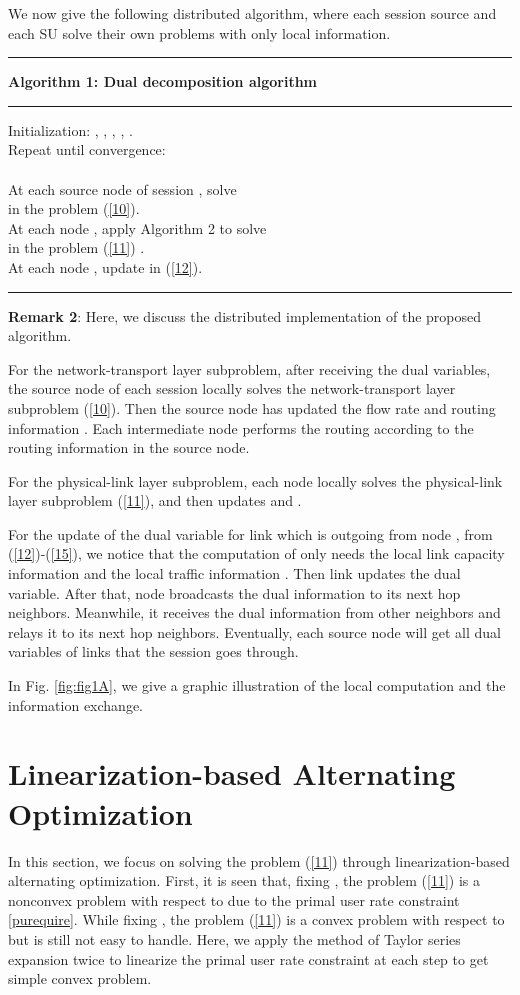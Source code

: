 \documentclass[12pt,onecolumn,tworows]{IEEEtran}
\begin{document}
We now give the following distributed algorithm, where
each session source and each SU solve their own problems with only
local information.

\noindent\rule{520pt}{1pt}
 \textbf{Algorithm 1: Dual decomposition algorithm}\\
 \noindent\rule{520pt}{0.65pt}
Initialization: , , , , .\\
Repeat until convergence:\\
 \indent  \indent \\
 \indent  \indent At each source node of session , solve  \\
  \indent  \indent in the problem (\ref{10}).\\
 \indent  \indent At each node , apply Algorithm 2 to solve\\
 \indent  \indent 
 in the problem (\ref{11}) .\\
 \indent  \indent At each node , update  in (\ref{12}).\\
\noindent\rule{520pt}{1pt}

\textbf{Remark 2}: Here, we discuss the distributed implementation of the proposed algorithm.

For the network-transport layer subproblem, after receiving the dual variables, the source node  of each session  locally solves the network-transport layer subproblem (\ref{10}).
Then the source node has updated the flow rate  and routing information . Each intermediate node performs the routing according to the routing information  in the source node.

For the physical-link layer subproblem, each node  locally solves the physical-link layer subproblem (\ref{11}), and then updates  and .

For the update of the dual variable  for link  which is outgoing from node , from (\ref{12})-(\ref{15}), we notice that the computation of  only needs the local link capacity information  and the local traffic information . Then link  updates the dual variable. After that, node  broadcasts the dual information to its next hop neighbors. Meanwhile, it receives the dual information from other neighbors and relays it to its next hop neighbors. Eventually, each source node will get all dual variables of links that the session goes through.

In Fig. \ref{fig:fig1A}, we give a graphic illustration of the local computation and the information exchange.

\section{Linearization-based Alternating Optimization}
In this section, we focus on solving the problem (\ref{11}) through linearization-based alternating optimization. First, it is seen that, fixing , the problem (\ref{11}) is a nonconvex problem with  respect to  due to the primal user rate constraint \eqref{purequire}. While fixing , the problem (\ref{11}) is a convex problem with respect to  but is still not easy to handle. Here, we apply the method of Taylor series
expansion twice to linearize the primal user rate constraint at
each step to get simple convex problem.
\end{document}
